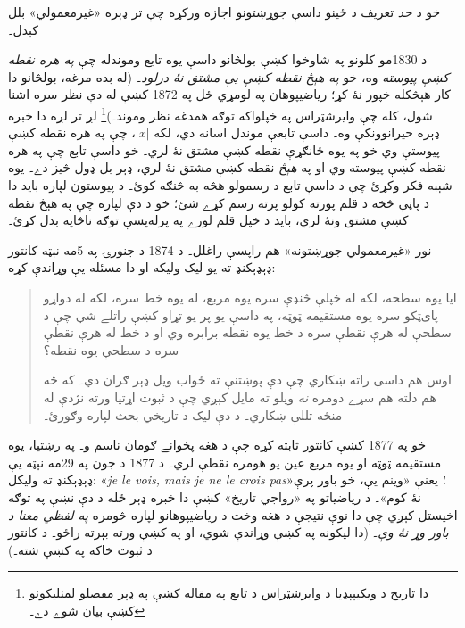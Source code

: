 \documentclass[../../../include/open-logic-section]{subfiles}
\begin{document}

خو د \emph{حد} تعريف د ځينو داسې جوړښتونو اجازه ورکړه چې تر ډېره «غيرمعمولي» بلل کېدل۔

د 1830مو کلونو په شاوخوا کښې بولڅانو داسې يوه تابع وموندله چې \emph{په هره نقطه کښې پيوسته} وه، خو \emph{په هېڅ نقطه کښې يې مشتق نۀ درلود}۔ (له بده مرغه، بولڅانو دا کار هېڅکله خپور نۀ کړ؛ رياضيپوهان په لومړي ځل په 1872 کښې له دې نظر سره اشنا شول، کله چې وايرشټراس په خپلواکه توګه همدغه نظر وموند۔)\footnote{دا تاريخ د ويکيپېډيا د \href{http://en.wikipedia.org/wiki/Weierstrass_function}{وايرشټراس د تابع} په مقاله کښې په ډېر مفصلو لمنليکونو کښې بيان شوے دے۔} لږ تر لږه دا خبره ډېره حيرانوونکې وه۔ داسې تابعې موندل اسانه دي، لکه $|x|$، چې په هره نقطه کښې پيوستې وي خو په يوه ځانګړې نقطه کښې مشتق نۀ لري۔ خو داسې تابع چې په هره نقطه کښې پيوسته وي او په \emph{هېڅ} نقطه کښې مشتق نۀ لري، ډېر بل ډول څيز دے۔ يوه شېبه فکر وکړئ چې د داسې تابع د رسمولو هڅه به څنګه کوئ۔ د پيوستون لپاره بايد دا د پاڼې څخه د قلم پورته کولو پرته رسم کړے شئ؛ خو د دې لپاره چې په هېڅ نقطه کښې مشتق ونۀ لري، بايد د خپل قلم لورے په پرله‌پسې توګه ناڅاپه بدل کړئ۔

نور «غيرمعمولي جوړښتونه» هم راپسې راغلل۔ د 1874 د جنورۍ په 5مه نېټه کانتور ډېډېکنډ ته يو ليک وليکه او دا مسئله يې وړاندې کړه:
\begin{quote}
ايا يوه سطحه، لکه له خپلې څنډې سره يوه مربع، له يوه
خط سره، لکه له دواړو پای‌ټکو سره يوه مستقيمه ټوټه، په داسې
يو پر يو تړاو کښې راتلے شي چې د سطحې له هرې نقطې سره د
خط يوه نقطه برابره وي او د خط له هرې نقطې سره د سطحې يوه
نقطه؟

اوس هم داسې راته ښکاري چې دې پوښتنې ته ځواب ويل ډېر ګران
دي۔ که څه هم دلته هم سړے دومره \emph{نه} ويلو ته مايل کېږي
چې د ثبوت اړتيا ورته نژدې له منځه تللې ښکاري۔ د دې ليک د
تاريخي بحث لپاره \citealt{Gouvea2011} وګورئ۔
\end{quote}
خو په 1877 کښې کانتور ثابته کړه چې د هغه پخوانے ګومان ناسم و۔ په رښتيا، يوه مستقيمه ټوټه او يوه مربع عين يو هومره نقطې لري۔ د 1877 د جون په 29مه نېټه يې ډېډېکنډ ته وليکل: «\emph{je le vois, mais je ne le crois pas}»؛ يعنې «وينم يې، خو باور پرې نۀ کوم»۔ د رياضياتو په «رواجي تاريخ» کښې دا خبره ډېر ځله د دې نښې په توګه اخيستل کېږي چې دا نوې نتيجې د هغه وخت د رياضيپوهانو لپاره څومره \emph{په لفظي معنا د باور وړ نۀ وې}۔ (دا ليکونه په \citet{Gouvea2011} کښې وړاندې شوي، او په  کښې ورته بېرته راځو۔ د کانتور د ثبوت خاکه په  کښې شته۔)
\end{document}
